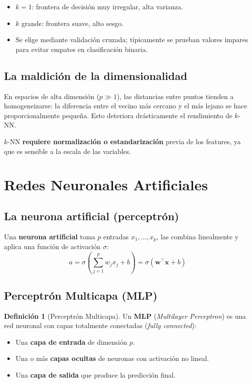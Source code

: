 \documentclass[12pt, a4paper]{article}
\theoremstyle{definition}
\newtheorem{definicion}{Definición}[section]
\theoremstyle{plain}
\theoremstyle{remark}
\newcommand{\bx}{\bm{x}}
\newcommand{\bw}{\bm{w}}
\begin{document}
\begin{itemize}
  \item $k = 1$: frontera de decisión muy irregular, alta varianza.
  \item $k$ grande: frontera suave, alto sesgo.
  \item Se elige mediante validación cruzada; típicamente se prueban valores impares para evitar empates en clasificación binaria.
\end{itemize}

\subsection{La maldición de la dimensionalidad}

En espacios de alta dimensión ($p \gg 1$), las distancias entre puntos tienden a homogeneizarse: la diferencia entre el vecino más cercano y el más lejano se hace proporcionalmente pequeña. Esto deteriora drásticamente el rendimiento de $k$-NN.

\begin{alerta}
  $k$-NN \textbf{requiere normalización o estandarización} previa de los features, ya que es sensible a la escala de las variables.
\end{alerta}

\section{Redes Neuronales Artificiales}

\subsection{La neurona artificial (perceptrón)}

Una \textbf{neurona artificial} toma $p$ entradas $x_1, \ldots, x_p$, las combina linealmente y aplica una función de activación $\sigma$:
\[
  a = \sigma\!\left(\sum_{j=1}^{p} w_j x_j + b\right) = \sigma(\bw^\top \bx + b)
\]

\subsection{Perceptrón Multicapa (MLP)}

\begin{definicion}[Perceptrón Multicapa]
  Un \textbf{MLP} (\textit{Multilayer Perceptron}) es una red neuronal con capas totalmente conectadas (\textit{fully connected}):
  \begin{itemize}
    \item Una \textbf{capa de entrada} de dimensión $p$.
    \item Una o más \textbf{capas ocultas} de neuronas con activación no lineal.
    \item Una \textbf{capa de salida} que produce la predicción final.
  \end{itemize}
\end{definicion}
\end{document}
